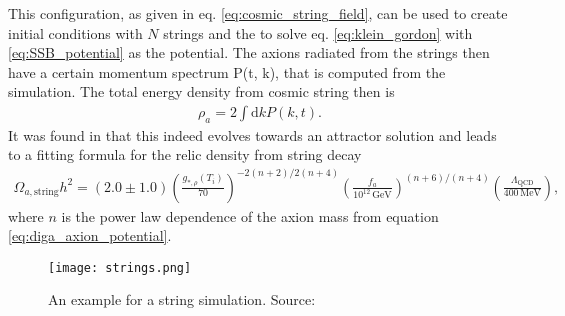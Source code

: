 \documentclass[twoside,a4paper, 12pt]{article}
\newcommand{\diff}{\mathrm{d}}
\numberwithin{equation}{section}
\begin{document}
\noindent
This configuration, as given in eq. \eqref{eq:cosmic_string_field}, can be used to create initial conditions
with $N$ strings and the to solve eq. \eqref{eq:klein_gordon} with \eqref{eq:SSB_potential} as the potential.
The axions radiated from the strings then have a certain momentum spectrum P(t, k), that is computed from the simulation.
The total energy density from cosmic string then is \cite[eq. 48]{StringFits}
\begin{align}
   \rho_a = 2 \int \diff k P(k, t). 
\end{align}
It was found in \cite{GorghettoAttractivStrings} that this indeed evolves towards an attractor solution and leads to a fitting formula for the relic density from string decay
\cite[Eq. 87]{StringFits}
\begin{align}
    \label{eq:string_fit}
    \Omega_{a, \mathrm{string}} h^2 = (2.0 \pm 1.0) \left(\frac{g_{*, \rho}(T_i)}{70} \right)^{-2(n + 2)/2(n + 4)}\left( \frac{f_a}{10^{12} \, \mathrm{GeV}} \right)^{(n + 6)/(n + 4)}\left(\frac{\Lambda_\mathrm{QCD}}{400 \, \mathrm{MeV}} \right),
\end{align}
where $n$ is the power law dependence of the axion mass from equation \eqref{eq:diga_axion_potential}.
\begin{figure}[H]
    \centering
    \texttt{[image: strings.png]}
    \caption{An example for a string simulation. Source: \cite[Fig. 2]{StringFits}}
    \label{fig:string_simulation}
\end{figure}
\end{document}
